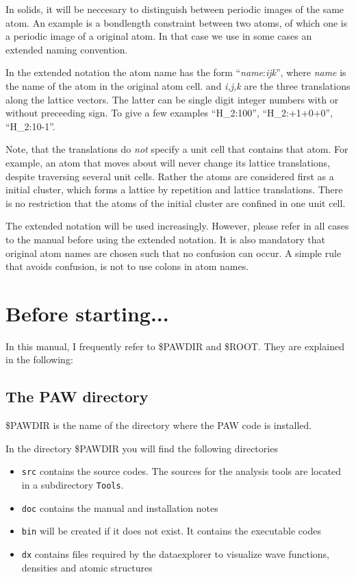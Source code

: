\documentclass[final,12pt]{article}
\begin{document}
In solids, it will be neccesary to distinguish between periodic images
of the same atom. An example is a bondlength constraint between two
atoms, of which one is a periodic image of a original atom. In that
case we use in some cases an extended naming convention.

In the extended notation the atom name has the form
``\textit{name}:\textit{ijk}'', where {\it name} is the name of the
atom in the original atom cell. and {\it i,j,k} are the three
translations along the lattice vectors. The latter can be single digit
integer numbers with or without preceeding sign. To give a few
examples ``H\_2:100'', ``H\_2:+1+0+0'', ``H\_2:10-1''.

Note, that the translations do {\em not} specify a unit cell that
contains that atom. For example, an atom that moves about will never
change its lattice translations, despite traversing several unit
cells. Rather the atoms are considered first as a initial cluster, which forms
a lattice by repetition and lattice translations. There is no
restriction that the atoms of the initial cluster are confined in one
unit cell.

The extended notation will be used increasingly. However, please refer
in all cases to the manual before using the extended notation. It is
also mandatory that original atom names are chosen such that no
confusion can occur. A simple rule that avoids confusion, is not to
use colons in atom names.

\section{Before starting...}
In this manual, I frequently refer to \$PAWDIR and \$ROOT. They are explained in the following:

\subsection{The PAW directory}
\$PAWDIR is the name of the directory where the PAW code is
installed. 

In the directory \$PAWDIR you will find the following directories 
\begin{itemize}
\item \verb|src| contains the source codes. The sources for the
analysis tools are located in a subdirectory \verb|Tools|.
\item \verb|doc| contains the manual and installation notes
\item \verb|bin| will be created if it does not exist. It contains the
executable codes
\item \verb|dx| contains files required by the dataexplorer to
visualize wave functions, densities and atomic structures
\end{itemize}
\end{document}
